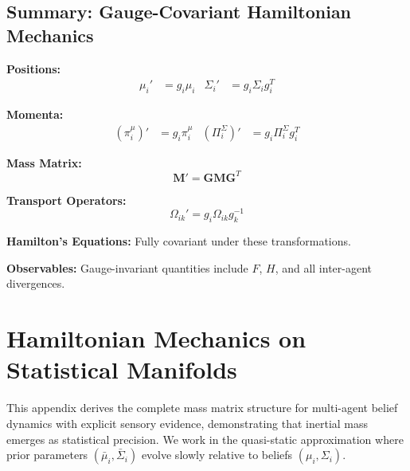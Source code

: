 \documentclass[12pt]{article}
\begin{document}
\subsection{Summary: Gauge-Covariant Hamiltonian Mechanics}

\begin{tcolorbox}[title=Gauge Transformation Laws]
\textbf{Positions:}
\begin{align}
\mu_i' &= g_i\mu_i & \Sigma_i' &= g_i\Sigma_i g_i^T
\end{align}

\textbf{Momenta:}
\begin{align}
(\pi_i^\mu)' &= g_i\pi_i^\mu & (\Pi_i^\Sigma)' &= g_i\Pi_i^\Sigma g_i^T
\end{align}

\textbf{Mass Matrix:}
\begin{equation}
\mathbf{M}' = \mathbf{G}\mathbf{M}\mathbf{G}^T
\end{equation}

\textbf{Transport Operators:}
\begin{equation}
\Omega_{ik}' = g_i\Omega_{ik}g_k^{-1}
\end{equation}

\textbf{Hamilton's Equations:} Fully covariant under these transformations.

\textbf{Observables:} Gauge-invariant quantities include $F$, $H$, and all inter-agent divergences.
\end{tcolorbox}




\section{Hamiltonian Mechanics on Statistical Manifolds}
\label{app:hamiltonian}

This appendix derives the complete mass matrix structure for multi-agent belief dynamics with explicit sensory evidence, demonstrating that inertial mass emerges as statistical precision. We work in the quasi-static approximation where prior parameters $(\bar{\mu}_i, \bar{\Sigma}_i)$ evolve slowly relative to beliefs $(\mu_i, \Sigma_i)$.
\end{document}

